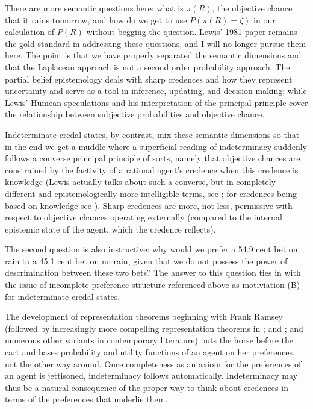 There are more semantic questions here: what is
$\pi(R)$, the objective chance that it rains tomorrow,
and how do we get to use $P(\pi(R)=\zeta)$ in our
calculation of $P(R)$ without begging the question.
Lewis' 1981 paper  remains the gold standard in
addressing these questions, and I will no longer pursue
them here. The point is that we have properly separated
the semantic dimensions and that the Laplacean approach
is not a second order probability approach. The partial
belief epistemology deals with sharp credences and how
they represent uncertainty and serve as a tool in
inference, updating, and decision making; while Lewis'
Humean speculations and his interpretation of the
principal principle cover the relationship between
subjective probabilities and objective chance.

Indeterminate credal states, by contrast, mix these
semantic dimensions so that in the end we get a muddle
where a superficial reading of indeterminacy suddenly
follows a converse principal principle of sorts, namely
that objective chances are constrained by the factivity
of a rational agent's credence when this credence is
knowledge (Lewis actually talks about such a converse,
but in completely different and epistemologically more
intelligible terms, see ; for
credences being based on knowledge see
). Sharp credences are more, not
less, permissive with respect to objective chances
operating externally (compared to the internal
epistemic state of the agent, which the credence
reflects).

The second question is also instructive: why would we
prefer a 54.9 cent bet on rain to a 45.1 cent bet on no
rain, given that we do not possess the power of
descrimination between these two bets? The answer to
this question ties in with the issue of incomplete
preference structure referenced above as motiviation
(B) for indeterminate credal states.

The development of representation theorems beginning
with Frank Ramsey (followed by increasingly more
compelling representation theorems in
; and ; and
numerous other variants in contemporary literature)
puts the horse before the cart and bases probability
and utility functions of an agent on her preferences,
not the other way around. Once completeness as an axiom
for the preferences of an agent is jettisoned,
indeterminacy follows automatically. Indeterminacy may
thus be a natural consequence of the proper way to
think about credences in terms of the preferences that
underlie them.

